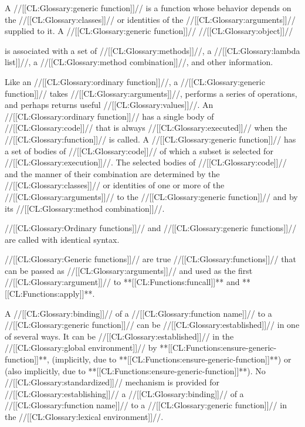 




A //[[CL:Glossary:generic function]]// is a function whose behavior depends on
the //[[CL:Glossary:classes]]// or identities of the //[[CL:Glossary:arguments]]// supplied to it.
A //[[CL:Glossary:generic function]]// //[[CL:Glossary:object]]// 

is associated with 
     a set of //[[CL:Glossary:methods]]//,
     a //[[CL:Glossary:lambda list]]//,
     a //[[CL:Glossary:method combination]]//, 
 and other information.

Like an //[[CL:Glossary:ordinary function]]//, a //[[CL:Glossary:generic function]]// takes //[[CL:Glossary:arguments]]//,
performs a series of operations, and perhaps returns useful //[[CL:Glossary:values]]//.
An //[[CL:Glossary:ordinary function]]// has a single body of //[[CL:Glossary:code]]// that is always //[[CL:Glossary:executed]]//
when the //[[CL:Glossary:function]]// is called.  A //[[CL:Glossary:generic function]]// has a set of bodies
of //[[CL:Glossary:code]]// of which a subset is selected for //[[CL:Glossary:execution]]//. The selected
bodies of //[[CL:Glossary:code]]// and the manner of their combination are determined by
the //[[CL:Glossary:classes]]// or identities of one or more of the //[[CL:Glossary:arguments]]// to the
//[[CL:Glossary:generic function]]// and by its //[[CL:Glossary:method combination]]//.

//[[CL:Glossary:Ordinary functions]]// and //[[CL:Glossary:generic functions]]// are called with identical syntax.
 
//[[CL:Glossary:Generic functions]]// are true //[[CL:Glossary:functions]]// that can be passed as //[[CL:Glossary:arguments]]//
and used as the first //[[CL:Glossary:argument]]// to **[[CL:Functions:funcall]]** and **[[CL:Functions:apply]]**.

A //[[CL:Glossary:binding]]// of a //[[CL:Glossary:function name]]// to a //[[CL:Glossary:generic function]]//
can be //[[CL:Glossary:established]]// in one of several ways.  It can be
//[[CL:Glossary:established]]// in the //[[CL:Glossary:global environment]]// by 
 **[[CL:Functions:ensure-generic-function]]**,
  (implicitly, due to **[[CL:Functions:ensure-generic-function]]**)
or
  (also implicitly, due to **[[CL:Functions:ensure-generic-function]]**).
No //[[CL:Glossary:standardized]]// mechanism is provided for //[[CL:Glossary:establishing]]// a
//[[CL:Glossary:binding]]// of a //[[CL:Glossary:function name]]// to a //[[CL:Glossary:generic function]]//
in the //[[CL:Glossary:lexical environment]]//.

